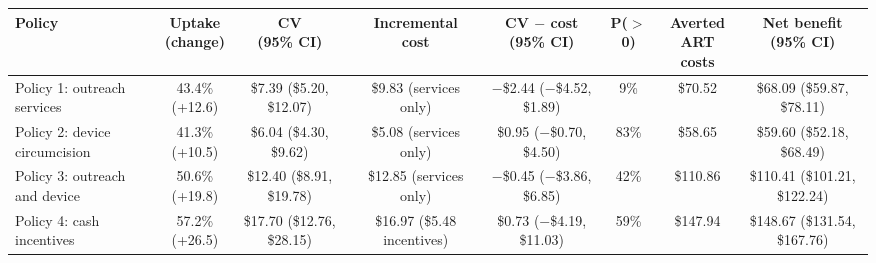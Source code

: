 \begin{tabular}{>{\raggedright\arraybackslash}p{2.7cm}ccccccc}
\toprule
Policy & \makecell{Uptake\\(change)} & \makecell{CV\\(95\% CI)} & \makecell{Incremental\\cost} & \makecell{CV $-$ cost\\(95\% CI)} & P($>$0) & \makecell{Averted\\ART costs} & \makecell{Net benefit\\(95\% CI)}
\\
\midrule
Policy 1: outreach services & \makecell{43.4\% \\ {\footnotesize (+12.6)}} & \makecell{\$7.39 \\ {\footnotesize (\$5.20, \$12.07)}} & \makecell{\$9.83 \\ {\footnotesize (services only)}} & \makecell{$-$\$2.44 \\ {\footnotesize ($-$\$4.52, \$1.89)}} & 9\% & \$70.52 & \makecell{\$68.09 \\ {\footnotesize (\$59.87, \$78.11)}} \\
Policy 2: device circumcision & \makecell{41.3\% \\ {\footnotesize (+10.5)}} & \makecell{\$6.04 \\ {\footnotesize (\$4.30, \$9.62)}} & \makecell{\$5.08 \\ {\footnotesize (services only)}} & \makecell{\$0.95 \\ {\footnotesize ($-$\$0.70, \$4.50)}} & 83\% & \$58.65 & \makecell{\$59.60 \\ {\footnotesize (\$52.18, \$68.49)}} \\
Policy 3: outreach and device & \makecell{50.6\% \\ {\footnotesize (+19.8)}} & \makecell{\$12.40 \\ {\footnotesize (\$8.91, \$19.78)}} & \makecell{\$12.85 \\ {\footnotesize (services only)}} & \makecell{$-$\$0.45 \\ {\footnotesize ($-$\$3.86, \$6.85)}} & 42\% & \$110.86 & \makecell{\$110.41 \\ {\footnotesize (\$101.21, \$122.24)}} \\
Policy 4: cash incentives & \makecell{57.2\% \\ {\footnotesize (+26.5)}} & \makecell{\$17.70 \\ {\footnotesize (\$12.76, \$28.15)}} & \makecell{\$16.97 \\ {\footnotesize (\$5.48 incentives)}} & \makecell{\$0.73 \\ {\footnotesize ($-$\$4.19, \$11.03)}} & 59\% & \$147.94 & \makecell{\$148.67 \\ {\footnotesize (\$131.54, \$167.76)}} \\

\end{tabular}
